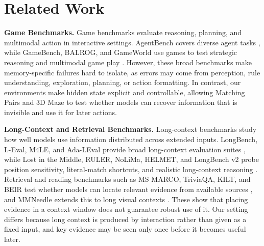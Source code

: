 \section{Related Work}
\label{sec:related}


\noindent\textbf{Game Benchmarks.} Game benchmarks evaluate reasoning, planning, and multimodal action in interactive settings. AgentBench covers diverse agent tasks \citep{liu2023agentbench}, while GameBench, BALROG, and GameWorld use games to test strategic reasoning and multimodal game play \citep{costarelli2024gamebench,paglieri2024balrog,ouyang2026gameworld}. However, these broad benchmarks make memory-specific failures hard to isolate, as errors may come from perception, rule understanding, exploration, planning, or action formatting. In contrast, our environments make hidden state explicit and controllable, allowing Matching Pairs and 3D Maze to test whether models can recover information that is invisible and use it for later actions.

\noindent\textbf{Long-Context and Retrieval Benchmarks.} Long-context benchmarks study how well models use information distributed across extended inputs. LongBench, L-Eval, M4LE, and Ada-LEval provide broad long-context evaluation suites \citep{bai2023longbench,an2024leval,kwan2024m4le,wang2024adaleval}, while Lost in the Middle, RULER, NoLiMa, HELMET, and LongBench v2 probe position sensitivity, literal-match shortcuts, and realistic long-context reasoning \citep{liu2024lostmiddle,hsieh2024ruler,modarressi2025nolima,yen2025helmet,bai2025longbenchv2}. Retrieval and reading benchmarks such as MS MARCO, TriviaQA, KILT, and BEIR test whether models can locate relevant evidence from available sources \citep{nguyen2016msmarco,joshi2017triviaqa,kwiatkowski2019naturalquestions,yang2018hotpotqa,petroni2021kilt,thakur2021beir}, and MMNeedle extends this to long visual contexts \citep{wang2024mmneedle}. These show that placing evidence in a context window does not guarantee robust use of it. Our setting differs because long context is produced by interaction rather than given as a fixed input, and key evidence may be seen only once before it becomes useful later.